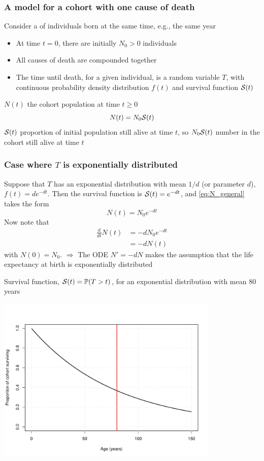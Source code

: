 \documentclass[aspectratio=169]{beamer}\usepackage[]{graphicx}\usepackage[]{xcolor}
\begin{document}
\begin{frame}\frametitle{A model for a cohort with one cause of death}
Consider a  of individuals born at the same time, e.g., the same year
\vfill
\begin{itemize}
\item At time $t=0$, there are initially $N_0>0$ individuals
\item All causes of death are compounded together 
\item The time until death, for a given individual, is a random variable $T$, with continuous probability density distribution $f(t)$ and survival function $\S(t)$
\end{itemize}
\vfill
$N(t)$ the cohort population at time $t\geq 0$
\begin{equation}\label{eq:N_general}
N(t)=N_0\S(t)
\end{equation}
\vfill
$\S(t)$ proportion of initial population still alive at time $t$, so $N_0\S(t)$ number in the cohort still alive at time $t$
\end{frame}

\begin{frame}\frametitle{Case where $T$ is exponentially distributed}
Suppose that $T$ has an exponential distribution with mean $1/d$ (or parameter $d$), $f(t)=de^{-dt}$. Then the survival function is $\S(t)=e^{-dt}$, and \eqref{eq:N_general} takes the form
\begin{equation}\label{eq:N}
N(t)=N_0e^{-dt}
\end{equation}
\vfill
Now note that
\begin{align*}
\frac{d}{dt} N(t) &= -dN_0e^{-dt} \\
&= -dN(t)
\end{align*}
with $N(0)=N_0$.
\vfill
{\red $\Rightarrow$} The ODE $N'=-dN$ makes the assumption that the life expectancy at birth is exponentially distributed
\end{frame}



\begin{frame}
Survival function, $\S(t)=\IP(T>t)$, for an exponential distribution with mean 80 years
\begin{center}
\includegraphics[width=0.8\textwidth]{FIGS/L24-prop_surviving_exp_80years-1.pdf}
\end{center}
\end{frame}
\end{document}
